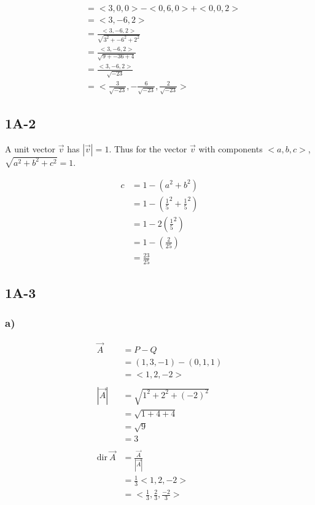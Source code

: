 \documentclass[main.tex]{subfiles}
\begin{document}
    \begin{align*}
        &= <3, 0, 0> - <0,6,0> + <0,0,2>\\
        &= <3,-6,2>\\
        &= \frac{<3,-6,2>}{\sqrt{3^2 + -6^2 + 2^2}}\\
        &= \frac{<3,-6,2>}{\sqrt{9 + -36 + 4}}\\
        &= \frac{<3,-6,2>}{\sqrt{-23}}\\
        &= <\frac{3}{\sqrt{-23}}, -\frac{6}{\sqrt{-23}},\frac{2}{\sqrt{-23}}>
    \end{align*}

\subsection*{1A-2}

A unit vector $\vec{v}$ has $|\vec{v}| = 1$.
Thus for the vector $\vec{v}$ with components $<a, b, c>$,
$\sqrt{a^2 + b^2 + c^2} = 1$.

\begin{align*}
 c &= 1 - (a^2 + b^2)\\
  &= 1 - (\frac{1}{5}^2 + \frac{1}{5}^2)\\
  &= 1 - 2(\frac{1}{5}^2)\\
  &= 1 - (\frac{2}{25})\\
  &= \frac{23}{25}
\end{align*}



\subsection*{1A-3}

\subsubsection*{a)}

    \begin{align*}
    \vec{A} &= P - Q \\
    &= (1,3,-1) - (0,1,1) \\
    &= <1,2,-2> \\
    \\
    |\vec{A}| &= \sqrt{1^2 + 2^2 + (-2)^2}\\
    &=\sqrt{1+4+4}\\
    &=\sqrt{9}\\
    &=3\\
    \\
    \text{dir} \ \vec{A} &= \frac{\vec{A}}{|\vec{A}|}\\
    &= \frac{1}{3} <1,2,-2>\\
    &= <\frac{1}{3},\frac{2}{3},\frac{-2}{3}>\\
    \end{align*}
\end{document}

